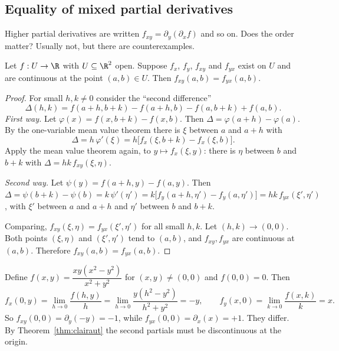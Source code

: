 \subsection{Equality of mixed partial derivatives}

Higher partial derivatives are written $f_{xy}=\partial_y(\partial_xf)$ and so on. Does the order matter? Usually not, but there are counterexamples.

\begin{theorem}\label{thm:clairaut}
Let $f:U\to\R$ with $U\subseteq\R^2$ open. Suppose $f_x$, $f_y$, $f_{xy}$ and $f_{yx}$ exist on $U$ and are continuous at the point $(a,b)\in U$. Then $f_{xy}(a,b)=f_{yx}(a,b)$.
\end{theorem}

\begin{proof}
For small $h,k\neq0$ consider the ``second difference''
\[
\Delta(h,k)=f(a+h,b+k)-f(a+h,b)-f(a,b+k)+f(a,b).
\]
\emph{First way.} Let $\varphi(x)=f(x,b+k)-f(x,b)$. Then $\Delta=\varphi(a+h)-\varphi(a)$. By the one-variable mean value theorem there is $\xi$ between $a$ and $a+h$ with
\[
\Delta=h\,\varphi'(\xi)=h\bigl[f_x(\xi,b+k)-f_x(\xi,b)\bigr].
\]
Apply the mean value theorem again, to $y\mapsto f_x(\xi,y)$: there is $\eta$ between $b$ and $b+k$ with $\Delta=hk\,f_{xy}(\xi,\eta)$.

\emph{Second way.} Let $\psi(y)=f(a+h,y)-f(a,y)$. Then $\Delta=\psi(b+k)-\psi(b)=k\,\psi'(\eta')=k\bigl[f_y(a+h,\eta')-f_y(a,\eta')\bigr]=hk\,f_{yx}(\xi',\eta')$, with $\xi'$ between $a$ and $a+h$ and $\eta'$ between $b$ and $b+k$.

Comparing, $f_{xy}(\xi,\eta)=f_{yx}(\xi',\eta')$ for all small $h,k$. Let $(h,k)\to(0,0)$. Both points $(\xi,\eta)$ and $(\xi',\eta')$ tend to $(a,b)$, and $f_{xy},f_{yx}$ are continuous at $(a,b)$. Therefore $f_{xy}(a,b)=f_{yx}(a,b)$.
\end{proof}

\begin{example}
Define $f(x,y)=\dfrac{xy(x^2-y^2)}{x^2+y^2}$ for $(x,y)\ne(0,0)$ and $f(0,0)=0$. Then
\[
f_x(0,y)=\lim_{h\to0}\frac{f(h,y)}{h}=\lim_{h\to0}\frac{y(h^2-y^2)}{h^2+y^2}=-y,\qquad
f_y(x,0)=\lim_{k\to0}\frac{f(x,k)}{k}=x .
\]
So $f_{xy}(0,0)=\partial_y(-y)=-1$, while $f_{yx}(0,0)=\partial_x(x)=+1$. They differ. By Theorem~\ref{thm:clairaut} the second partials must be discontinuous at the origin.
\end{example}

